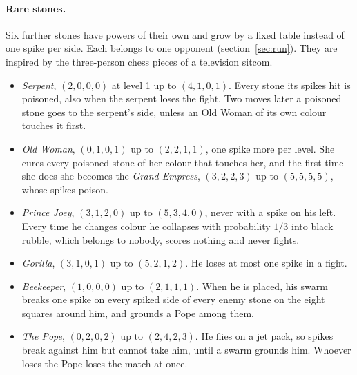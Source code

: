 \documentclass[11pt,a4paper]{article}
\begin{document}
\paragraph{Rare stones.} Six further stones have powers of their own and grow by a fixed table instead of one spike per side. Each belongs to one opponent (section~\ref{sec:run}). They are inspired by the three-person chess pieces of a television sitcom.
\begin{itemize}
  \item \emph{Serpent}, $(2,0,0,0)$ at level 1 up to $(4,1,0,1)$. Every stone its spikes hit is poisoned, also when the serpent loses the fight. Two moves later a poisoned stone goes to the serpent's side, unless an Old Woman of its own colour touches it first.
  \item \emph{Old Woman}, $(0,1,0,1)$ up to $(2,2,1,1)$, one spike more per level. She cures every poisoned stone of her colour that touches her, and the first time she does she becomes the \emph{Grand Empress}, $(3,2,2,3)$ up to $(5,5,5,5)$, whose spikes poison.
  \item \emph{Prince Joey}, $(3,1,2,0)$ up to $(5,3,4,0)$, never with a spike on his left. Every time he changes colour he collapses with probability $1/3$ into black rubble, which belongs to nobody, scores nothing and never fights.
  \item \emph{Gorilla}, $(3,1,0,1)$ up to $(5,2,1,2)$. He loses at most one spike in a fight.
  \item \emph{Beekeeper}, $(1,0,0,0)$ up to $(2,1,1,1)$. When he is placed, his swarm breaks one spike on every spiked side of every enemy stone on the eight squares around him, and grounds a Pope among them.
  \item \emph{The Pope}, $(0,2,0,2)$ up to $(2,4,2,3)$. He flies on a jet pack, so spikes break against him but cannot take him, until a swarm grounds him. Whoever loses the Pope loses the match at once.
\end{itemize}
\end{document}
